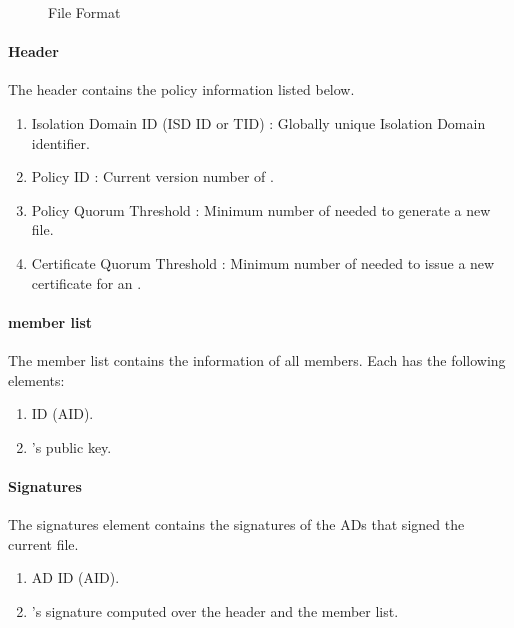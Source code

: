 \begin{figure}[h]
\centering
\begin{center}
\end{center}
\caption{\RT File Format}\label{fig:rot-file}
\end{figure}


\paragraph{Header}
The header contains the \ISDC policy information listed below. 

\begin{enumerate}
\item Isolation Domain ID (ISD ID or TID) : Globally unique Isolation Domain identifier.
\item Policy ID : Current version number of \PF.
\item Policy Quorum Threshold : Minimum number of \ISDC \ADs needed to generate a new \RT file. 
\item Certificate Quorum Threshold : Minimum number of \ISDC \ADs needed to issue a new certificate for an \AD.
\end{enumerate}

\paragraph{\ISDC member list}
The \ISDC member list contains the information of all \ISDC members. Each \AD has the following elements:
\begin{enumerate}
\item \AD ID (AID).
\item \AD's public key.
\end{enumerate}

\paragraph{Signatures}
The signatures element contains the signatures of the \ISDC ADs that signed the current \RT file.
\begin{enumerate}
\item AD ID (AID).
\item \AD's signature computed over the header and the \ISDC member list.
\end{enumerate}

